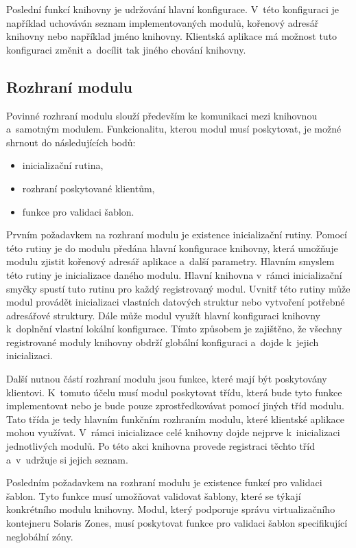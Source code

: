 Poslední funkcí knihovny je udržování hlavní konfigurace. V~této konfiguraci je například uchováván seznam implementovaných
modulů, kořenový adresář knihovny nebo například jméno knihovny. Klientská aplikace má možnost tuto konfiguraci změnit
a~docílit tak jiného chování knihovny.
\subsection{Rozhraní modulu}
\label{chapter:implementation:library:interface}
Povinné rozhraní modulu slouží především ke komunikaci mezi knihovnou a~samotným modulem. Funkcionalitu, kterou modul
musí poskytovat, je možné shrnout do následujících bodů:
\begin{itemize}
 \item inicializační rutina,
 \item rozhraní poskytované klientům,
 \item funkce pro validaci šablon.
\end{itemize}
Prvním požadavkem na rozhraní modulu je existence inicializační rutiny. Pomocí této rutiny je do modulu předána hlavní
konfigurace knihovny, která umožňuje modulu zjistit kořenový adresář aplikace a~další parametry. Hlavním smyslem
této rutiny je inicializace daného modulu. Hlavní knihovna v~rámci inicializační smyčky spustí tuto rutinu pro každý
registrovaný modul. Uvnitř této rutiny může modul provádět inicializaci vlastních datových struktur nebo vytvoření potřebné
adresářové struktury. Dále může modul využít hlavní konfiguraci knihovny k~doplnění vlastní lokální konfigurace. Tímto způsobem
je zajištěno, že všechny registrované moduly knihovny obdrží globální konfiguraci a~dojde k~jejich inicializaci.

Další nutnou částí rozhraní modulu jsou funkce, které mají být poskytovány klientovi. K~tomuto účelu musí modul poskytovat
třídu, která bude tyto funkce implementovat nebo je bude pouze zprostředkovávat pomocí jiných tříd modulu. Tato třída je tedy
hlavním funkčním rozhraním modulu, které klientské aplikace mohou využívat. V~rámci inicializace celé knihovny dojde nejprve
k~inicializaci jednotlivých modulů. Po této akci knihovna provede registraci těchto tříd a~v~udržuje si jejich seznam.

Posledním požadavkem na rozhraní modulu je existence funkcí pro validaci šablon. Tyto funkce musí umožňovat validovat šablony,
které se týkají konkrétního modulu knihovny. Modul, který podporuje správu virtualizačního kontejneru Solaris Zones, musí poskytovat
funkce pro validaci šablon specifikující neglobální zóny.

